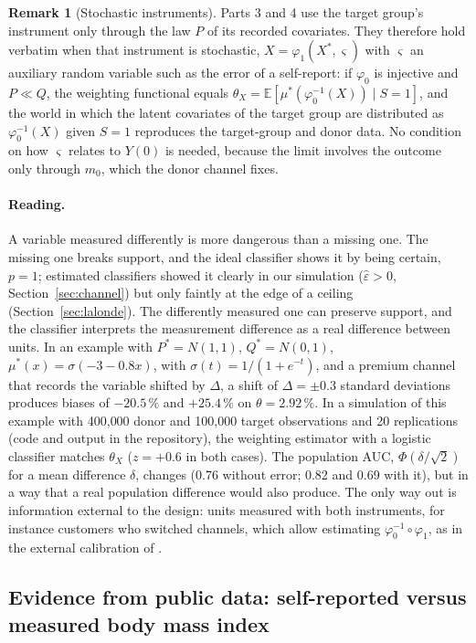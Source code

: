 \documentclass[twoside,11pt]{article}
\newcommand{\E}{\mathbb{E}}
\theoremstyle{plain}
\theoremstyle{definition}
\newtheorem{remark}{Remark}
\begin{document}
\begin{remark}[Stochastic instruments]\label{rem:stochastic}
Parts 3 and 4 use the target group's instrument only through the law $P$ of its recorded covariates. They therefore hold verbatim when that instrument is stochastic, $X=\varphi_1(X^*,\varsigma)$ with $\varsigma$ an auxiliary random variable such as the error of a self-report: if $\varphi_0$ is injective and $P\ll Q$, the weighting functional equals $\theta_X=\E[\mu^*(\varphi_0^{-1}(X))\mid S=1]$, and the world in which the latent covariates of the target group are distributed as $\varphi_0^{-1}(X)$ given $S=1$ reproduces the target-group and donor data. No condition on how $\varsigma$ relates to $Y(0)$ is needed, because the limit involves the outcome only through $m_0$, which the donor channel fixes.
\end{remark}

\paragraph{Reading.} A variable measured differently is more dangerous than a missing one. The missing one breaks support, and the ideal classifier shows it by being certain, $p=1$; estimated classifiers showed it clearly in our simulation ($\hat\varepsilon>0$, Section~\ref{sec:channel}) but only faintly at the edge of a ceiling (Section~\ref{sec:lalonde}). The differently measured one can preserve support, and the classifier interprets the measurement difference as a real difference between units. In an example with $P^*=N(1,1)$, $Q^*=N(0,1)$, $\mu^*(x)=\sigma(-3-0.8x)$, with $\sigma(t)=1/(1+e^{-t})$, and a premium channel that records the variable shifted by $\Delta$, a shift of $\Delta=\pm0.3$ standard deviations produces biases of $-20.5\,\%$ and $+25.4\,\%$ on $\theta=2.92\,\%$. In a simulation of this example with 400{,}000 donor and 100{,}000 target observations and 20 replications (code and output in the repository), the weighting estimator with a logistic classifier matches $\theta_X$ ($z=+0.6$ in both cases). The population AUC, $\Phi(\delta/\sqrt2)$ for a mean difference $\delta$, changes (0.76 without error; 0.82 and 0.69 with it), but in a way that a real population difference would also produce. The only way out is information external to the design: units measured with both instruments, for instance customers who switched channels, which allow estimating $\varphi_0^{-1}\circ\varphi_1$, as in the external calibration of \citet{webbvargas2017}.

\subsection{Evidence from public data: self-reported versus measured body mass index}\label{sec:nhanes}
\end{document}
